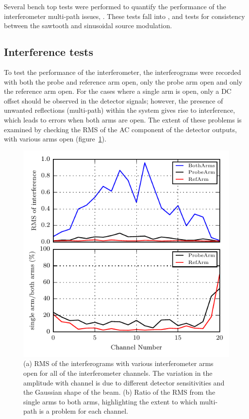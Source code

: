 \thispagestyle{empty}

Several bench top tests were performed to quantify the performance of the interferometer multi-path issues, . These tests fall into  , and tests for consistency between the sawtooth and sinusoidal source modulation.

\subsection{Interference tests}
To test the performance of the interferometer, the interferograms were recorded with both the probe and reference arm open, only the probe arm open and only the reference arm open.
For the cases where a single arm is open, only a DC offset should be observed in the detector signals; however, the presence of unwanted reflections (multi-path) within the system gives rise to interference, which leads to errors when both arms are open.
The extent of these problems is examined by checking the RMS of the AC component of the detector outputs, with various arms open (figure~\ref{fig:RMS_interference}).

\begin{figure}[!h]
\begin{center}
\includegraphics[]{figures/interference.pdf}
\end{center}
\caption{(a) RMS of the interferograms with various interferometer arms open for all of the interferometer channels. The variation in the amplitude with channel is due to different detector sensitivities and the Gaussian shape of the beam. (b) Ratio of the RMS from the single arms to both arms, highlighting the extent to which multi-path is a problem for each channel.}
\label{fig:RMS_interference}
\end{figure}

